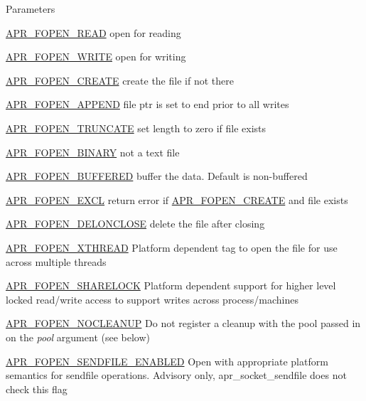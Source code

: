 \begin{DoxyParams}{Parameters}
\begin{DoxyItemize}
\item \hyperlink{group__apr__file__open__flags_gaf9e7303f028b130ff7d4b209d6662d7d}{A\+P\+R\+\_\+\+F\+O\+P\+E\+N\+\_\+\+R\+E\+AD} open for reading \item \hyperlink{group__apr__file__open__flags_gac598bb95fc9476b0bf2ed0b1c308842c}{A\+P\+R\+\_\+\+F\+O\+P\+E\+N\+\_\+\+W\+R\+I\+TE} open for writing \item \hyperlink{group__apr__file__open__flags_gafe94f21ccbf411172e70e7f473af251a}{A\+P\+R\+\_\+\+F\+O\+P\+E\+N\+\_\+\+C\+R\+E\+A\+TE} create the file if not there \item \hyperlink{group__apr__file__open__flags_ga45f353db9b71d4760a3f35cf3781cfc8}{A\+P\+R\+\_\+\+F\+O\+P\+E\+N\+\_\+\+A\+P\+P\+E\+ND} file ptr is set to end prior to all writes \item \hyperlink{group__apr__file__open__flags_ga09b05a5bd5db534b93794f7657bcb146}{A\+P\+R\+\_\+\+F\+O\+P\+E\+N\+\_\+\+T\+R\+U\+N\+C\+A\+TE} set length to zero if file exists \item \hyperlink{group__apr__file__open__flags_gacb20b3028864f34cb26314fe2cacc3fa}{A\+P\+R\+\_\+\+F\+O\+P\+E\+N\+\_\+\+B\+I\+N\+A\+RY} not a text file \item \hyperlink{group__apr__file__open__flags_gac48fd4c853c9f561632a2e8aaf5d8d97}{A\+P\+R\+\_\+\+F\+O\+P\+E\+N\+\_\+\+B\+U\+F\+F\+E\+R\+ED} buffer the data. Default is non-\/buffered \item \hyperlink{group__apr__file__open__flags_gabb7fb062cdf1d58faee8c7ea518496f1}{A\+P\+R\+\_\+\+F\+O\+P\+E\+N\+\_\+\+E\+X\+CL} return error if \hyperlink{group__apr__file__open__flags_gafe94f21ccbf411172e70e7f473af251a}{A\+P\+R\+\_\+\+F\+O\+P\+E\+N\+\_\+\+C\+R\+E\+A\+TE} and file exists \item \hyperlink{group__apr__file__open__flags_ga5d3756f6d242c667ed1d3f54af4916eb}{A\+P\+R\+\_\+\+F\+O\+P\+E\+N\+\_\+\+D\+E\+L\+O\+N\+C\+L\+O\+SE} delete the file after closing \item \hyperlink{group__apr__file__open__flags_ga435cd9b2604b11796779c23ffa00a3dd}{A\+P\+R\+\_\+\+F\+O\+P\+E\+N\+\_\+\+X\+T\+H\+R\+E\+AD} Platform dependent tag to open the file for use across multiple threads \item \hyperlink{group__apr__file__open__flags_ga426f6e2a8457ab410d99248269059a18}{A\+P\+R\+\_\+\+F\+O\+P\+E\+N\+\_\+\+S\+H\+A\+R\+E\+L\+O\+CK} Platform dependent support for higher level locked read/write access to support writes across process/machines \item \hyperlink{group__apr__file__open__flags_ga3fc9b5a7791d9f462997cd29de67eb80}{A\+P\+R\+\_\+\+F\+O\+P\+E\+N\+\_\+\+N\+O\+C\+L\+E\+A\+N\+UP} Do not register a cleanup with the pool passed in on the {\itshape pool} argument (see below) \item \hyperlink{group__apr__file__open__flags_ga60c21e28e4a612d58a874fe2cc71a6e4}{A\+P\+R\+\_\+\+F\+O\+P\+E\+N\+\_\+\+S\+E\+N\+D\+F\+I\+L\+E\+\_\+\+E\+N\+A\+B\+L\+ED} Open with appropriate platform semantics for sendfile operations. Advisory only, apr\+\_\+socket\+\_\+sendfile does not check this flag \item 
\end{DoxyItemize}
\end{DoxyParams}
